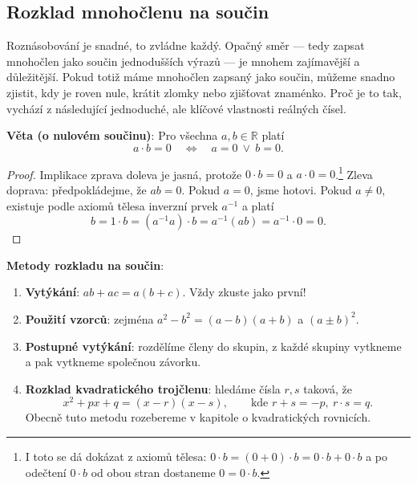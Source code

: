 \subsection{Rozklad mnohočlenu na součin}\label{sec:rozklad-soucin}

Roznásobování je snadné, to zvládne každý. Opačný směr --- tedy zapsat mnohočlen jako součin jednodušších výrazů --- je mnohem zajímavější a důležitější. Pokud totiž máme mnohočlen zapsaný jako součin, můžeme snadno zjistit, kdy je roven nule, krátit zlomky nebo zjišťovat znaménko. Proč je to tak, vychází z následující jednoduché, ale klíčové vlastnosti reálných čísel.

\begin{definitionbox}
  \textbf{Věta (o nulovém součinu)}: Pro všechna $a, b\in\mathbb{R}$ platí
  \begin{equation*}
    a\cdot b = 0\quad\Leftrightarrow\quad a = 0\ \lor\ b = 0.
  \end{equation*}
\end{definitionbox}

\begin{proof}
  Implikace zprava doleva je jasná, protože $0\cdot b = 0$ a $a\cdot 0 = 0$.\footnote{I toto se dá dokázat z axiomů tělesa: $0\cdot b = (0 + 0)\cdot b = 0\cdot b + 0\cdot b$ a po odečtení $0\cdot b$ od obou stran dostaneme $0 = 0\cdot b$.} Zleva doprava: předpokládejme, že $ab = 0$. Pokud $a = 0$, jsme hotovi. Pokud $a\neq 0$, existuje podle axiomů tělesa inverzní prvek $a^{-1}$ a platí
  \begin{equation*}
    b = 1\cdot b = (a^{-1}a)\cdot b = a^{-1}(ab) = a^{-1}\cdot 0 = 0.
  \end{equation*}
\end{proof}

\begin{definitionbox}
  \textbf{Metody rozkladu na součin}:
  \begin{enumerate}
    \item \textbf{Vytýkání}: $ab + ac = a(b + c)$. Vždy zkuste jako první!
    \item \textbf{Použití vzorců}: zejména $a^2 - b^2 = (a - b)(a + b)$ a ${(a\pm b)}^2$.
    \item \textbf{Postupné vytýkání}: rozdělíme členy do skupin, z každé skupiny vytkneme a pak vytkneme společnou závorku.
    \item \textbf{Rozklad kvadratického trojčlenu}: hledáme čísla $r, s$ taková, že
    \begin{equation*}
      x^2 + px + q = (x - r)(x - s),\qquad\text{kde } r + s = -p,\ r\cdot s = q.
    \end{equation*}
    Obecně tuto metodu rozebereme v kapitole o kvadratických rovnicích.
  \end{enumerate}
\end{definitionbox}

